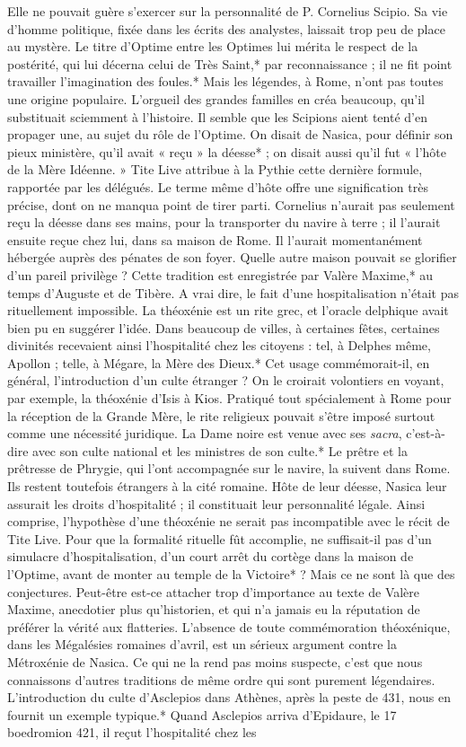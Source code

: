 \documentclass[a4paper, 11pt, oneside, polutonikogreek, french]{article}
\begin{document}
Elle ne pouvait guère s'exercer sur la personnalité de P. Cornelius Scipio. Sa vie d'homme politique, fixée dans les écrits des analystes, laissait trop peu de place au mystère. Le titre d'Optime entre les Optimes lui mérita le respect de la postérité, qui lui décerna celui de Très Saint,* par reconnaissance ; il ne fit point travailler l'imagination des foules.* Mais les légendes, à Rome, n'ont pas toutes une origine populaire. L'orgueil des grandes familles en créa beaucoup, qu'il substituait sciemment à l'histoire. Il semble que les Scipions aient tenté d'en propager une, au sujet du rôle de l'Optime. On disait de Nasica, pour définir son pieux ministère, qu'il avait « reçu » la déesse* ; on disait aussi qu'il fut « l'hôte de la Mère Idéenne. » Tite Live attribue à la Pythie cette dernière formule, rapportée par les délégués. Le terme même d'hôte offre une signification très précise, dont on ne manqua point de tirer parti. Cornelius n'aurait pas seulement reçu la déesse dans ses mains, pour la transporter du navire à terre ; il l'aurait ensuite reçue chez lui, dans sa maison de Rome. Il l'aurait momentanément hébergée auprès des pénates de son foyer. Quelle autre maison pouvait se glorifier d'un pareil privilège ? Cette tradition est enregistrée par Valère Maxime,* au temps d'Auguste et de Tibère. A vrai dire, le fait d'une hospitalisation n'était pas rituellement impossible. La théoxénie est un rite grec, et l'oracle delphique avait bien pu en suggérer l'idée. Dans beaucoup de villes, à certaines fêtes, certaines divinités recevaient ainsi l'hospitalité chez les citoyens : tel, à Delphes même, Apollon ; telle, à Mégare, la Mère des Dieux.* Cet usage commémorait-il, en général, l'introduction d'un culte étranger ? On le croirait volontiers en voyant, par exemple, la théoxénie d'Isis à Kios. Pratiqué tout spécialement à Rome pour la réception de la Grande Mère, le rite religieux pouvait s'être imposé surtout comme une nécessité juridique. La Dame noire est venue avec ses \emph{sacra}, c'est-à-dire avec son culte national et les ministres de son culte.* Le prêtre et la prêtresse de Phrygie, qui l'ont accompagnée sur le navire, la suivent dans Rome. Ils restent toutefois étrangers à la cité romaine. Hôte de leur déesse, Nasica leur assurait les droits d'hospitalité ; il constituait leur personnalité légale. Ainsi comprise, l'hypothèse d'une théoxénie ne serait pas incompatible avec le récit de Tite Live. Pour que la formalité rituelle fût accomplie, ne suffisait-il pas d'un simulacre d'hospitalisation, d'un court arrêt du cortège dans la maison de l'Optime, avant de monter au temple de la Victoire* ? Mais ce ne sont là que des conjectures. Peut-être est-ce attacher trop d'importance au texte de Valère Maxime, anecdotier plus qu'historien, et qui n'a jamais eu la réputation de préférer la vérité aux flatteries. L'absence de toute commémoration théoxénique, dans les Mégalésies romaines d'avril, est un sérieux argument contre la Métroxénie de Nasica. Ce qui ne la rend pas moins suspecte, c'est que nous connaissons d'autres traditions de même ordre qui sont purement légendaires. L'introduction du culte d'Asclepios dans Athènes, après la peste de 431, nous en fournit un exemple typique.* Quand Asclepios arriva d'Epidaure, le 17 boedromion 421, il reçut l'hospitalité chez les 
\end{document}
